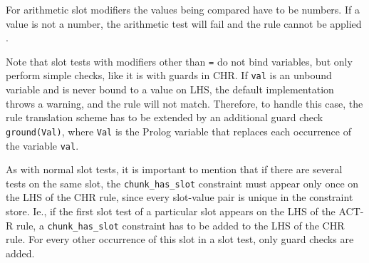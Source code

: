 For arithmetic slot modifiers the values being compared have to be numbers. If a value is not a number, the arithmetic test will fail and the rule cannot be applied \cite{actr_reference}.

Note that slot tests with modifiers other than \lstinline|=| do not bind variables, but only perform simple checks, like it is with guards in CHR. If \lstinline|val| is an unbound variable and is never bound to a value on LHS, the default implementation throws a warning, and the rule will not match. Therefore, to handle this case, the rule translation scheme has to be extended by an additional guard check \lstinline|ground(Val)|, where \lstinline|Val| is the Prolog variable that replaces each occurrence of the variable \lstinline|val|.

As with normal slot tests, it is important to mention that if there are several tests on the same slot, the \lstinline|chunk_has_slot| constraint must appear only once on the LHS of the CHR rule, since every slot-value pair is unique in the constraint store. Ie., if the first slot test of a particular slot appears on the LHS of the ACT-R rule, a \lstinline|chunk_has_slot| constraint has to be added to the LHS of the CHR rule. For every other occurrence of this slot in a slot test, only guard checks are added.

